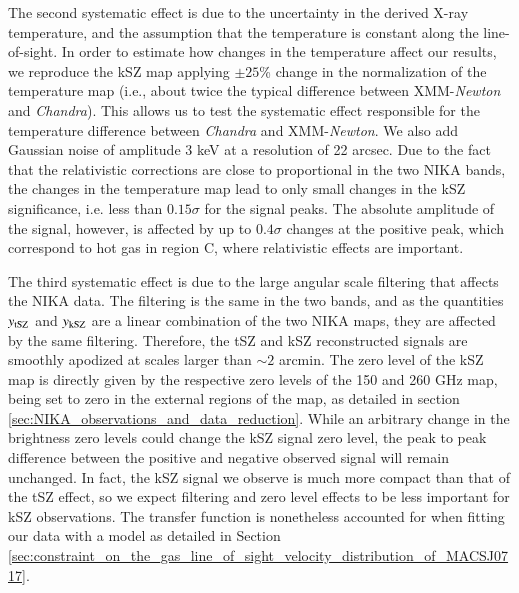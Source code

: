 \documentclass[twocolumn,traditabstract]{aa}
\begin{document}
The second systematic effect is due to the uncertainty in the derived X-ray temperature, and the assumption that the temperature is constant along the line-of-sight. In order to estimate how changes in the temperature affect our results, we reproduce the kSZ map applying $\pm 25$\% change in the normalization of the temperature map (i.e., about twice the typical difference between XMM-\textit{Newton} and \textit{Chandra}). This allows us to test the systematic effect responsible for the temperature difference between \textit{Chandra} and XMM-\textit{Newton}. We also add Gaussian noise of amplitude 3 keV at a resolution of 22 arcsec. Due to the fact that the relativistic corrections are close to proportional in the two NIKA bands, the changes in the temperature map lead to only small changes in the kSZ significance, i.e. less than $0.15 \sigma$ for the signal peaks. The absolute amplitude of the signal, however, is affected by up to $0.4 \sigma$ changes at the positive peak, which correspond to hot gas in region C, where relativistic effects are important.

The third systematic effect is due to the large angular scale filtering that affects the NIKA data. The filtering is the same in the two bands, and as the quantities $y_{\rm tSZ}$ and $y_{\rm kSZ}$ are a linear combination of the two NIKA maps, they are affected by the same filtering. Therefore, the tSZ and kSZ reconstructed signals are smoothly apodized at scales larger than $\sim 2$ arcmin. The zero level of the kSZ map is directly given by the respective zero levels of the 150 and 260 GHz map, being set to zero in the external regions of the map, as detailed in section \ref{sec:NIKA_observations_and_data_reduction}. While an arbitrary change in the brightness zero levels could change the kSZ signal zero level, the peak to peak difference between the positive and negative observed signal will remain unchanged. In fact, the kSZ signal we observe is much more compact than that of the tSZ effect, so we expect filtering and zero level effects to be less important for kSZ observations. The transfer function is nonetheless accounted for when fitting our data with a model as detailed in Section \ref{sec:constraint_on_the_gas_line_of_sight_velocity_distribution_of_MACSJ0717}.

\end{document}
